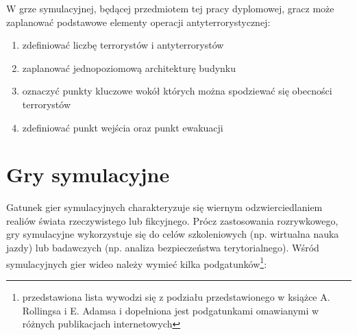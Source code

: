 W grze symulacyjnej, będącej przedmiotem tej pracy dyplomowej, gracz może zaplanować podstawowe elementy operacji antyterrorystycznej:
\begin{enumerate}
	\item zdefiniować liczbę terrorystów i antyterrorystów
	\item zaplanować jednopoziomową architekturę budynku
	\item oznaczyć punkty kluczowe wokół których można spodziewać się obecności terrorystów
	\item zdefiniować punkt wejścia oraz punkt ewakuacji
\end{enumerate}

\section{Gry symulacyjne}
Gatunek gier symulacyjnych charakteryzuje się wiernym odzwierciedlaniem realiów świata rzeczywistego lub fikcyjnego. Prócz zastosowania rozrywkowego, gry symulacyjne wykorzystuje się do celów szkoleniowych (np. wirtualna nauka jazdy) lub badawczych (np. analiza bezpieczeństwa terytorialnego). Wśród symulacyjnych gier wideo należy wymieć kilka podgatunków\footnote{przedstawiona lista wywodzi się z podziału przedstawionego w książce A. Rollingsa i E. Adamsa\cite{gameDesign} i dopełniona jest podgatunkami omawianymi w różnych publikacjach internetowych}:

